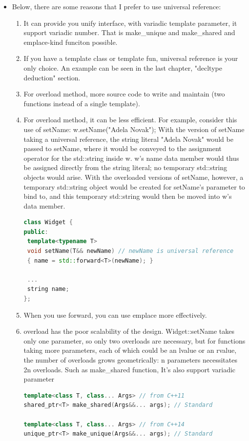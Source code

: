 \documentclass[a4paper,12pt,twoside]{book}
\begin{document}
\begin{itemize}
\item Below, there are some reasons that I prefer to use universal reference:

\begin{enumerate}
\item It can provide you unify interface, with variadic template parameter, it support variadic number. That is make\_unique and make\_shared and emplace-kind funciton possible.

\item If you have a template class or template fun, universal reference is your only choice. An example can be seen in the last chapter, "decltype deduction" section.

\item For overload method, more source code to write and maintain (two functions instead of a single template). 

\item For overload method, it can be less efficient. For example, consider this use of setName: w.setName("Adela Novak"); With the version of setName taking a universal reference, the string literal "Adela Novak" would be passed to setName, where it would be conveyed to the assignment operator for the std::string inside w. w's name data member would thus be assigned directly from the string literal; no temporary std::string objects would arise. With the overloaded versions of setName, however, a temporary std::string object
would be created for setName's parameter to bind to, and this temporary std::string would then be moved into w's data member.

\begin{lstlisting}[frame=single, language=c++]
class Widget {
public:
 template<typename T>
 void setName(T&& newName) // newName is universal reference
 { name = std::forward<T>(newName); }
 
 ... 
 string name;    
};

\end{lstlisting}

\item When you use forward, you can use emplace more effectively.

\item overload has the poor scalability of the design. Widget::setName takes only one parameter, so only two overloads are necessary, but for functions taking more parameters, each of which could be an lvalue or an rvalue, the number of overloads grows geometrically: n parameters necessitates 2n overloads. Such as make\_shared function, It's also support variadic parameter

\begin{lstlisting}[frame=single, language=c++]
template<class T, class... Args> // from C++11
shared_ptr<T> make_shared(Args&&... args); // Standard

template<class T, class... Args> // from C++14
unique_ptr<T> make_unique(Args&&... args); // Standard
\end{lstlisting}

\end{enumerate}


\end{itemize}
\end{document}

